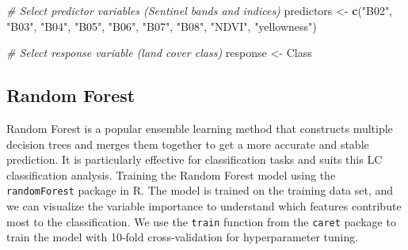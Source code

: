 \documentclass[
]{article}
\newenvironment{Shaded}{\begin{snugshade}}{\end{snugshade}}
\newcommand{\CommentTok}[1]{\textcolor[rgb]{0.56,0.35,0.01}{\textit{#1}}}
\newcommand{\FunctionTok}[1]{\textcolor[rgb]{0.13,0.29,0.53}{\textbf{#1}}}
\newcommand{\NormalTok}[1]{#1}
\newcommand{\OtherTok}[1]{\textcolor[rgb]{0.56,0.35,0.01}{#1}}
\newcommand{\StringTok}[1]{\textcolor[rgb]{0.31,0.60,0.02}{#1}}
\begin{document}
\begin{Shaded}
\begin{Highlighting}[]
\CommentTok{\# Select predictor variables (Sentinel bands and indices)}
\NormalTok{predictors }\OtherTok{\textless{}{-}} \FunctionTok{c}\NormalTok{(}\StringTok{"B02"}\NormalTok{, }\StringTok{"B03"}\NormalTok{, }\StringTok{"B04"}\NormalTok{, }\StringTok{"B05"}\NormalTok{, }\StringTok{"B06"}\NormalTok{, }\StringTok{"B07"}\NormalTok{, }\StringTok{"B08"}\NormalTok{, }\StringTok{"NDVI"}\NormalTok{, }\StringTok{"yellowness"}\NormalTok{)}

\CommentTok{\# Select response variable (land cover class)}
\NormalTok{response }\OtherTok{\textless{}{-}} \StringTok{\textquotesingle{}Class\textquotesingle{}}
\end{Highlighting}
\end{Shaded}

\subsection{Random Forest}\label{random-forest}

Random Forest is a popular ensemble learning method that constructs
multiple decision trees and merges them together to get a more accurate
and stable prediction. It is particularly effective for classification
tasks and suits this LC classification analysis. Training the Random
Forest model using the \texttt{randomForest} package in R. The model is
trained on the training data set, and we can visualize the variable
importance to understand which features contribute most to the
classification. We use the \texttt{train} function from the
\texttt{caret} package to train the model with 10-fold cross-validation
for hyperparameter tuning.
\end{document}
